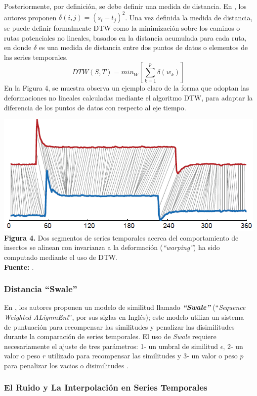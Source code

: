 Posteriormente, por definici\'on, se debe definir una medida de distancia. En \cite{dtw}, los autores proponen $\delta(i,j) = (s_i - t_j)^2$. Una vez definida la medida de distancia, se puede definir formalmente DTW como la minimizaci\'on sobre los caminos o rutas potenciales no lineales, basados en la distancia acumulada para cada ruta, en donde $\delta$ es una medida de distancia entre dos puntos de datos o elementos de las series temporales.
\begin{equation}
DTW (S,T) = min_W[\sum\limits_{k=1}^{p}\delta(w_k)]
\end{equation}
En la Figura 4, se muestra observa un ejemplo claro de la forma que adoptan las deformaciones no lineales calculadas mediante el algoritmo DTW, para adaptar la diferencia de los puntos de datos con respecto al eje tiempo.
\begin{center}
\includegraphics[scale=0.7]{dtw2.png}\\
\vspace*{10pt}
\footnotesize{\textbf{Figura 4.} Dos segmentos de series temporales acerca del comportamiento de insectos se alinean con invarianza a la deformaci\'on (\textit{\enquote{warping}}) ha sido computado mediante el uso de DTW.}\\ \textbf{Fuente:} \cite{dtw}.
\end{center}
\subsubsection{\textbf{Distancia \enquote{Swale}}}
En \cite{swale}, los autores proponen un modelo de similitud llamado \textbf{\textit{\enquote{Swale}}} (\enquote{\textit{Sequence Weighted ALignmEnt}}, por sus siglas en Ingl\'es); este modelo utiliza un sistema de puntuaci\'on para recompensar las similitudes y penalizar las disimilitudes durante la comparaci\'on de series temporales. El uso de \textit{Swale} requiere necesariamente el ajuste de tres par\'ametros: 1- un umbral de similitud \textbf{$\epsilon$}, 2- un valor o peso $r$ utilizado para recompensar las similitudes y 3- un valor o peso $p$ para penalizar los vacios o disimilitudes \cite{swale}.
\subsubsection{El Ruido y La Interpolaci\'on en Series Temporales}